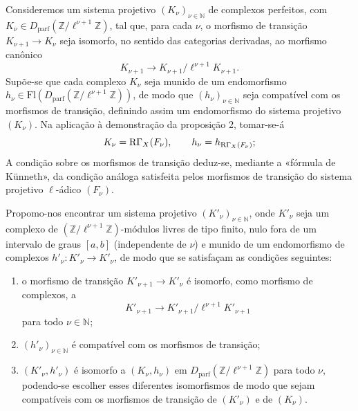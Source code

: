 Consideremos um sistema projetivo $(K_\nu)_{\nu\in\mathbb N}$ de complexos perfeitos, com $K_\nu\in D_{\mathrm{parf}}(\mathbb Z/\ell^{\nu+1}\mathbb Z)$, tal que, para cada $\nu$, o morfismo de transição $K_{\nu+1}\to K_\nu$ seja isomorfo, no sentido das categorias derivadas, ao morfismo canônico
\[
K_{\nu+1}\to K_{\nu+1}/\ell^{\nu+1}K_{\nu+1}.
\]
Supõe-se que cada complexo $K_\nu$ seja munido de um endomorfismo $h_\nu\in\mathrm{Fl}(D_{\mathrm{parf}}(\mathbb Z/\ell^{\nu+1}\mathbb Z))$, de modo que $(h_\nu)_{\nu\in\mathbb N}$ seja compatível com os morfismos de transição, definindo assim um endomorfismo do sistema projetivo $(K_\nu)$. Na aplicação à demonstração da proposição 2, tomar-se-á
\[
K_\nu=\mathrm{R}\Gamma_X(F_\nu),\qquad h_\nu=h_{\mathrm{R}\Gamma_X(F_\nu)};
\]
A condição sobre os morfismos de transição deduz-se, mediante a «fórmula de Künneth», da condição análoga satisfeita pelos morfismos de transição do sistema projetivo $\ell$-ádico $(F_\nu)$.

Propomo-nos encontrar um sistema projetivo $(K'_\nu)_{\nu\in\mathbb N}$, onde $K'_\nu$ seja um complexo de $(\mathbb Z/\ell^{\nu+1}\mathbb Z)$-módulos livres de tipo finito, nulo fora de um intervalo de graus $[a,b]$ (independente de $\nu$) e munido de um endomorfismo de complexos $h'_\nu:K'_\nu\to K'_\nu$, de modo que se satisfaçam as condições seguintes:
\begin{enumerate}[label=\arabic*)]
\item o morfismo de transição $K'_{\nu+1}\to K'_\nu$ é isomorfo, como morfismo de complexos, a
\[
K'_{\nu+1}\to K'_{\nu+1}/\ell^{\nu+1}K'_{\nu+1}
\]
para todo $\nu\in\mathbb N$;
\item $(h'_\nu)_{\nu\in\mathbb N}$ é compatível com os morfismos de transição;
\item $(K'_\nu,h'_\nu)$ é isomorfo a $(K_\nu,h_\nu)$ em $D_{\mathrm{parf}}(\mathbb Z/\ell^{\nu+1}\mathbb Z)$ para todo $\nu$, podendo-se escolher esses diferentes isomorfismos de modo que sejam compatíveis com os morfismos de transição de $(K'_\nu)$ e de $(K_\nu)$.
\end{enumerate}
